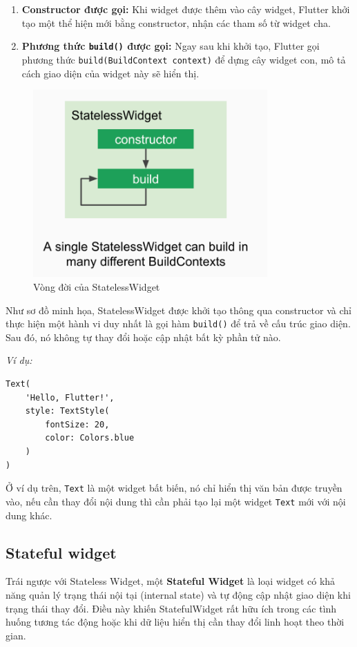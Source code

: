 \documentclass[../DoAn.tex]{subfiles}
\numberwithin{figure}{chapter}
\begin{document}
\begin{enumerate}
\item \textbf{Constructor được gọi:} Khi widget được thêm vào cây widget, Flutter khởi tạo một thể hiện mới bằng constructor, nhận các tham số từ widget cha.
\item \textbf{Phương thức \texttt{build()} được gọi:} Ngay sau khi khởi tạo, Flutter gọi phương thức \texttt{build(BuildContext context)} để dựng cây widget con, mô tả cách giao diện của widget này sẽ hiển thị.
\end{enumerate}
\begin{figure}[H]
    \centering
    \includegraphics[width=0.8\textwidth]{Hinhve/Chuong5/statelesswidgetimg.png}
    \caption{Vòng đời của StatelessWidget}
    \label{fig:statelesswidgetimg}
\end{figure}

Như sơ đồ minh họa, StatelessWidget được khởi tạo thông qua constructor và chỉ thực hiện một hành vi duy nhất là gọi hàm \texttt{build()} để trả về cấu trúc giao diện. Sau đó, nó không tự thay đổi hoặc cập nhật bất kỳ phần tử nào.

\textit{Ví dụ:}
\begin{lstlisting}
Text(
    'Hello, Flutter!', 
    style: TextStyle(
        fontSize: 20, 
        color: Colors.blue
    )
)
\end{lstlisting}


Ở ví dụ trên, \texttt{Text} là một widget bất biến, nó chỉ hiển thị văn bản được truyền vào, nếu cần thay đổi nội dung thì cần phải tạo lại một widget \texttt{Text} mới với nội dung khác.

\subsection{Stateful widget}
Trái ngược với Stateless Widget, một \textbf{Stateful Widget} là loại widget có khả năng quản lý trạng thái nội tại (internal state) và tự động cập nhật giao diện khi trạng thái thay đổi. Điều này khiến StatefulWidget rất hữu ích trong các tình huống tương tác động hoặc khi dữ liệu hiển thị cần thay đổi linh hoạt theo thời gian.
\end{document}
